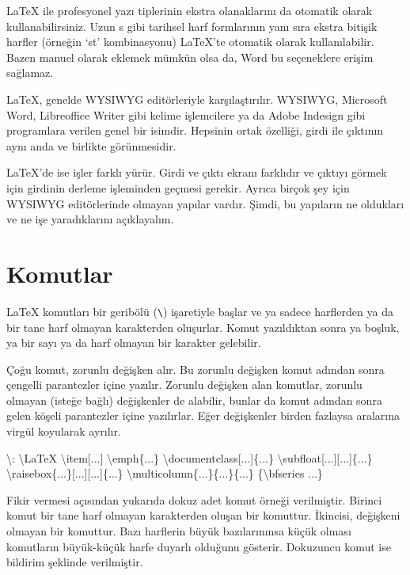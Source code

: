 \documentclass[
  10pt,
]{scrbook}
\newenvironment{Shaded}{\begin{snugshade}}{\end{snugshade}}
\newcommand{\NormalTok}[1]{#1}
\begin{document}
LaTeX ile profesyonel yazı tiplerinin ekstra olanaklarını da otomatik
olarak kullanabilirsiniz. Uzun s gibi tarihsel harf formlarının yanı
sıra ekstra bitişik harfler (örneğin `st' kombinasyonu) LaTeX'te
otomatik olarak kullanılabilir. Bazen manuel olarak eklemek mümkün olsa
da, Word bu seçeneklere erişim sağlamaz.

LaTeX, genelde WYSIWYG editörleriyle karşılaştırılır. WYSIWYG, Microsoft
Word, Libreoffice Writer gibi kelime işlemcilere ya da Adobe Indesign
gibi programlara verilen genel bir isimdir. Hepsinin ortak özelliği,
girdi ile çıktının aynı anda ve birlikte görünmesidir.

LaTeX'de ise işler farklı yürür. Girdi ve çıktı ekranı farklıdır ve
çıktıyı görmek için girdinin derleme işleminden geçmesi gerekir. Ayrıca
birçok şey için WYSIWYG editörlerinde olmayan yapılar vardır. Şimdi, bu
yapıların ne oldukları ve ne işe yaradıklarını açıklayalım.

\hypertarget{komutlar}{%
\section{Komutlar}\label{komutlar}}

LaTeX komutları bir geribölü (\texttt{\textbackslash{}}) işaretiyle başlar ve ya sadece
harflerden ya da bir tane harf olmayan karakterden oluşurlar. Komut
yazıldıktan sonra ya boşluk, ya bir sayı ya da harf olmayan bir karakter
gelebilir.

Çoğu komut, zorunlu değişken alır. Bu zorunlu değişken komut adından
sonra çengelli parantezler içine yazılır. Zorunlu değişken alan
komutlar, zorunlu olmayan (isteğe bağlı) değişkenler de alabilir, bunlar
da komut adından sonra gelen köşeli parantezler içine yazılırlar. Eğer
değişkenler birden fazlaysa aralarına virgül koyularak ayrılır.

\begin{Shaded}
\begin{Highlighting}[]
\NormalTok{\textbackslash{}:}
\NormalTok{\textbackslash{}LaTeX}
\NormalTok{\textbackslash{}item[...]}
\NormalTok{\textbackslash{}emph\{...\}}
\NormalTok{\textbackslash{}documentclass[...]\{...\}}
\NormalTok{\textbackslash{}subfloat[...][...]\{...\}}
\NormalTok{\textbackslash{}raisebox\{...\}[...][...]\{...\}}
\NormalTok{\textbackslash{}multicolumn\{...\}\{...\}\{...\}}
\NormalTok{\{\textbackslash{}bfseries ...\}}
\end{Highlighting}
\end{Shaded}

Fikir vermesi açısından yukarıda dokuz adet komut örneği verilmiştir.
Birinci komut bir tane harf olmayan karakterden oluşan bir komuttur.
İkincisi, değişkeni olmayan bir komuttur. Bazı harflerin büyük
bazılarınınsa küçük olması komutların büyük-küçük harfe duyarlı olduğunu
gösterir. Dokuzuncu komut ise bildirim şeklinde verilmiştir.
\end{document}
